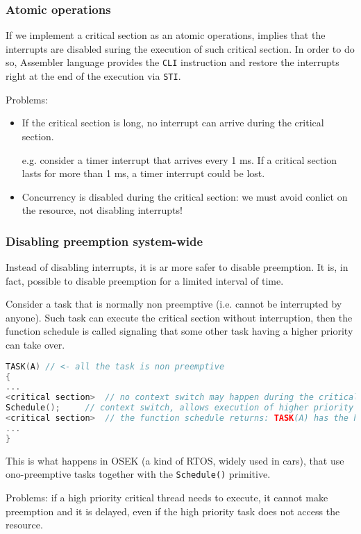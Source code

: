 \subsubsection{Atomic operations}
If we implement a critical section as an atomic operations, implies that the interrupts are disabled suring the execution of such critical section. In order to do so, Assembler language provides the \texttt{CLI} instruction and restore the interrupts right at the end of the execution via \texttt{STI}.

Problems:
\begin{itemize}
\item If the critical section is long, no interrupt can arrive during the critical section.

e.g. consider a timer interrupt that arrives every 1 ms. If a critical section lasts for more than 1 ms, a timer interrupt could be lost.
\item Concurrency is disabled during the critical section: we must avoid conlict on the resource, not disabling interrupts!
\end{itemize}

\subsubsection{Disabling preemption system-wide}
Instead of disabling interrupts, it is ar more safer to disable preemption. It is, in fact, possible to disable preemption for a limited interval of time.

Consider a task that is normally non preemptive (i.e. cannot be interrupted by anyone). Such task can execute the critical section without interruption, then the function schedule is called signaling that some other task having a higher priority can take over.

\begin{lstlisting}[language=C++]
TASK(A) // <- all the task is non preemptive
{
...
<critical section> 	// no context switch may happen during the critical section
Schedule();		// context switch, allows execution of higher priority tasks
<critical section>	// the function schedule returns: TASK(A) has the higher priority task
...
}
\end{lstlisting}

This is what happens in OSEK (a kind of RTOS, widely used in cars), that use ono-preemptive tasks together with the \texttt{Schedule()} primitive.

Problems: if a high priority critical thread needs to execute, it cannot make preemption and it is delayed, even if the high priority task does not access the resource.

